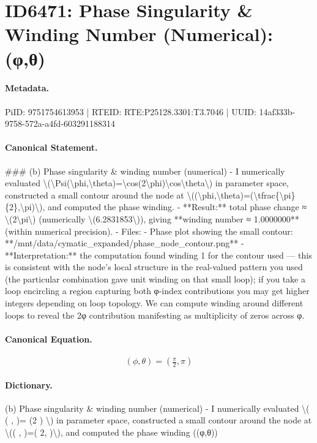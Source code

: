 \section*{ID6471: Phase Singularity \& Winding Number (Numerical): (φ,θ)}
\paragraph{Metadata.}
PiID: 9751754613953 | RTEID: RTE:P25128.3301:T3.7046 | UUID: 14af333b-9758-572a-a4fd-603291188314

\paragraph{Canonical Statement.}
\#\#\# (b) Phase singularity \& winding number (numerical) - I numerically evaluated \textbackslash{}(\textbackslash{}Psi(\textbackslash{}phi,\textbackslash{}theta)=\textbackslash{}cos(2\textbackslash{}phi)\textbackslash{}cos\textbackslash{}theta\textbackslash{}) in parameter space, constructed a small contour around the node at \textbackslash{}((\textbackslash{}phi,\textbackslash{}theta)=(\textbackslash{}tfrac\{\textbackslash{}pi\}\{2\},\textbackslash{}pi)\textbackslash{}), and computed the phase winding. - **Result:** total phase change ≈ \textbackslash{}(2\textbackslash{}pi\textbackslash{}) (numerically \textbackslash{}(6.2831853\textbackslash{})), giving **winding number ≈ 1.0000000** (within numerical precision). - Files: - Phase plot showing the small contour: **/mnt/data/cymatic\_expanded/phase\_node\_contour.png** - **Interpretation:** the computation found winding 1 for the contour used — this is consistent with the node’s local structure in the real-valued pattern you used (the particular combination gave unit winding on that small loop); if you take a loop encircling a region capturing both φ-index contributions you may get higher integers depending on loop topology. We can compute winding around different loops to reveal the 2φ contribution manifesting as multiplicity of zeros across φ.

\paragraph{Canonical Equation.}
\[
(\phi,\theta)=(\tfrac{\pi}{2},\pi)
\]

\paragraph{Dictionary.}
(b) Phase singularity \& winding number (numerical) - I numerically evaluated \textbackslash{}( ( , )= (2 ) \textbackslash{}) in parameter space, constructed a small contour around the node at \textbackslash{}(( , )=( 2, )\textbackslash{}), and computed the phase winding ((φ,θ))

